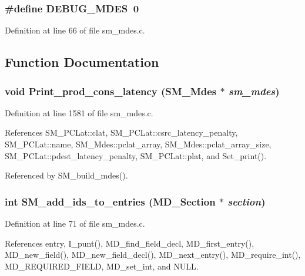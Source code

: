 \subsubsection{\setlength{\rightskip}{0pt plus 5cm}\#define DEBUG\_\-MDES~0}\label{sm__mdes_8c_b96bf528414b7bb8a87c4af7bfa3e62e}




Definition at line 66 of file sm\_\-mdes.c.

\subsection{Function Documentation}
\subsubsection{\setlength{\rightskip}{0pt plus 5cm}void Print\_\-prod\_\-cons\_\-latency (\bf{SM\_\-Mdes} $\ast$ {\em sm\_\-mdes})}\label{sm__mdes_8c_1b547ab6c50642646c1eaad613cc2e6f}




Definition at line 1581 of file sm\_\-mdes.c.

References SM\_\-PCLat::clat, SM\_\-PCLat::csrc\_\-latency\_\-penalty, SM\_\-PCLat::name, SM\_\-Mdes::pclat\_\-array, SM\_\-Mdes::pclat\_\-array\_\-size, SM\_\-PCLat::pdest\_\-latency\_\-penalty, SM\_\-PCLat::plat, and Set\_\-print().

Referenced by SM\_\-build\_\-mdes().
\subsubsection{\setlength{\rightskip}{0pt plus 5cm}int SM\_\-add\_\-ids\_\-to\_\-entries (\bf{MD\_\-Section} $\ast$ {\em section})}\label{sm__mdes_8c_4d1665aeb658c58e66a84443a500d2c2}




Definition at line 71 of file sm\_\-mdes.c.

References entry, I\_\-punt(), MD\_\-find\_\-field\_\-decl, MD\_\-first\_\-entry(), MD\_\-new\_\-field(), MD\_\-new\_\-field\_\-decl(), MD\_\-next\_\-entry(), MD\_\-require\_\-int(), MD\_\-REQUIRED\_\-FIELD, MD\_\-set\_\-int, and NULL.

